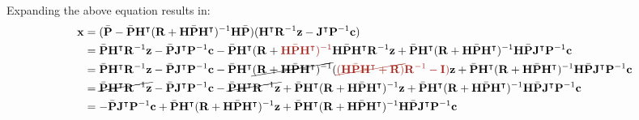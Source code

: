 \documentclass[10pt]{article}
\begin{document}
Expanding the above equation results in:
\begin{equation}  
	\begin{aligned}   
		{\mathbf{x}} & = (\bar{\mathbf{P}} -\bar{\mathbf{P}}\mathbf{H}^{\intercal}(\mathbf{R} + \mathbf{H}\bar{\mathbf{P}}\mathbf{H}^{\intercal})^{-1}\mathbf{H}\bar{\mathbf{P}})( 
		\mathbf{H}^{\intercal}\mathbf{R}^{-1}\mathbf{z} - \mathbf{J}^{\intercal}\mathbf{P}^{-1}\mathbf{c}) \\  
		& = \bar{\mathbf{P}}\mathbf{H}^{\intercal}\mathbf{R}^{-1}\mathbf{z} - \bar{\mathbf{P}}\mathbf{J}^{\intercal}\mathbf{P}^{-1}\mathbf{c} 
		-\bar{\mathbf{P}}\mathbf{H}^{\intercal}(\mathbf{R} + {\color{Mahogany} \mathbf{H}\bar{\mathbf{P}}\mathbf{H}^{\intercal})^{-1} } \mathbf{H}\bar{\mathbf{P}}\mathbf{H}^{\intercal}\mathbf{R}^{-1}  \mathbf{z} +\bar{\mathbf{P}}\mathbf{H}^{\intercal}(\mathbf{R} + \mathbf{H}\bar{\mathbf{P}}\mathbf{H}^{\intercal})^{-1}\mathbf{H}\bar{\mathbf{P}}\mathbf{J}^{\intercal}\mathbf{P}^{-1}\mathbf{c} \\ 
		& = \bar{\mathbf{P}}\mathbf{H}^{\intercal}\mathbf{R}^{-1}\mathbf{z} - \bar{\mathbf{P}}\mathbf{J}^{\intercal}\mathbf{P}^{-1}\mathbf{c} 
		-\bar{\mathbf{P}}\mathbf{H}^{\intercal} \cancel{ (\mathbf{R} + \mathbf{H}\bar{\mathbf{P}}\mathbf{H}^{\intercal})^{-1} }  ({\color{Mahogany} \cancel{ (\mathbf{H}\bar{\mathbf{P}}\mathbf{H}^{\intercal}+\mathbf{R})} \mathbf{R}^{-1} - \mathbf{I}) }  \mathbf{z}  +\bar{\mathbf{P}}\mathbf{H}^{\intercal}(\mathbf{R} + \mathbf{H}\bar{\mathbf{P}}\mathbf{H}^{\intercal})^{-1}\mathbf{H}\bar{\mathbf{P}}\mathbf{J}^{\intercal}\mathbf{P}^{-1}\mathbf{c} \\ 
		& = \cancel{ \bar{\mathbf{P}}\mathbf{H}^{\intercal}\mathbf{R}^{-1}\mathbf{z} } - \bar{\mathbf{P}}\mathbf{J}^{\intercal}\mathbf{P}^{-1}\mathbf{c} 
		- \cancel{ \bar{\mathbf{P}}\mathbf{H}^{\intercal}\mathbf{R}^{-1}\mathbf{z} }  + \bar{\mathbf{P}}\mathbf{H}^{\intercal}(\mathbf{R} + \mathbf{H}\bar{\mathbf{P}}\mathbf{H}^{\intercal})^{-1}\mathbf{z}  +\bar{\mathbf{P}}\mathbf{H}^{\intercal}(\mathbf{R} + \mathbf{H}\bar{\mathbf{P}}\mathbf{H}^{\intercal})^{-1}\mathbf{H}\bar{\mathbf{P}}\mathbf{J}^{\intercal}\mathbf{P}^{-1}\mathbf{c} \\ 
		& =  - \bar{\mathbf{P}}\mathbf{J}^{\intercal}\mathbf{P}^{-1}\mathbf{c} 
		+ \bar{\mathbf{P}}\mathbf{H}^{\intercal}(\mathbf{R} + \mathbf{H}\bar{\mathbf{P}}\mathbf{H}^{\intercal})^{-1}\mathbf{z}   +\bar{\mathbf{P}}\mathbf{H}^{\intercal}(\mathbf{R} + \mathbf{H}\bar{\mathbf{P}}\mathbf{H}^{\intercal})^{-1}\mathbf{H}\bar{\mathbf{P}}\mathbf{J}^{\intercal}\mathbf{P}^{-1}\mathbf{c} \\ 

\end{aligned}
\end{equation}
\end{document}
